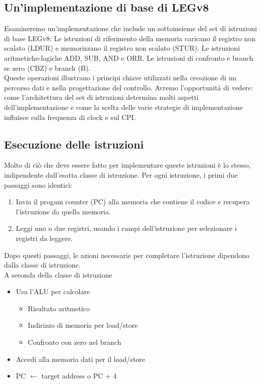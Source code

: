 \documentclass[12pt,a4paper]{article}
\begin{document}
\subsection{Un'implementazione di base di LEGv8}
Esamineremo un'implementazione che include un sottoinsieme del set di istruzioni di base LEGv8:
Le istruzioni di riferimento della memoria caricano il registro non scalato (LDUR) e memorizzano il registro non scalato (STUR). Le istruzioni aritmetiche-logiche ADD, SUB, AND e ORR. Le istruzioni di confronto e branch se zero (CBZ) e branch (B).\\
Queste operazioni illustrano i principi chiave utilizzati nella creazione di un percorso dati e nella progettazione del controllo. Avremo l'opportunità di vedere: come l'architettura del set di istruzioni determina molti aspetti dell'implementazione e come la scelta delle varie strategie di implementazione influisce sulla frequenza di clock e sul CPI.

\subsection{Esecuzione delle istruzioni}
Molto di ciò che deve essere fatto per implementare queste istruzioni è lo stesso, indipendente dall'esatta classe di istruzione. Per ogni istruzione, i primi due passaggi sono identici:
\begin{enumerate}
\item Invia il progam counter (PC) alla memoria che contiene il codice e recupera l'istruzione da quella memoria.
\item Leggi uno o due registri, usando i campi dell'istruzione per selezionare i registri da leggere.
\end{enumerate}
Dopo questi passaggi, le azioni necessarie per completare l'istruzione dipendono dalla classe di istruzione.\\
A seconda della classe di istruzione\\
\begin{itemize}
\item Usa l'ALU per calcolare
\begin{itemize}
\item Risultato aritmetico
\item Indirizzo di memoria per load/store
\item Confronto con zero nel branch
\end{itemize}
\item Accedi alla memoria dati per il load/store 
\item PC $\leftarrow$ target address o PC + 4
\end{itemize}
\end{document}
